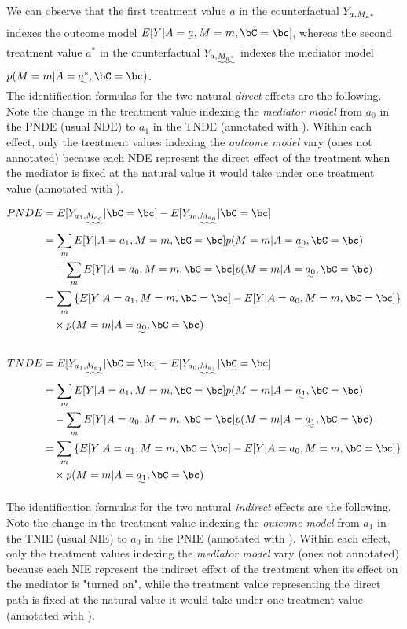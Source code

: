 \documentclass[10pt]{article}
\begin{document}
We can observe that the first treatment value \(a\) in the counterfactual \(Y_{\uwave{a},M_{a^{*}}}\) indexes the outcome model \(E[Y | A = \uwave{a}, M = m, \bC = \bc]\), whereas the second treatment value \(a^{*}\) in the counterfactual \(Y_{a,\uwave{M_{a^{*}}}}\) indexes the mediator model \(p(M = m | A = \uwave{a^{*}}, \bC = \bc)\).\\

The identification formulas for the two natural \emph{direct} effects are the following. Note the change in the treatment value indexing the \emph{mediator model} from \(a_{0}\) in the PNDE (usual NDE) to \(a_{1}\) in the TNDE (annotated with \uwave{~~~~}). Within each effect, only the treatment values indexing the \emph{outcome model} vary (ones not annotated) because each NDE represent the direct effect of the treatment when the mediator is fixed at the natural value it would take under one treatment value (annotated with \uwave{~~~~}).

\begin{align*}
  PNDE
  &= E[Y_{a_{1},\uwave{M_{a_{0}}}} | \bC = \bc] - E[Y_{a_{0},\uwave{M_{a_{0}}}} | \bC = \bc]\\
  &=     \sum_{m} E[Y | A = a_{1}, M = m, \bC = \bc] p(M = m | A = \uwave{a_{0}}, \bC = \bc)\\
  &~~~ - \sum_{m} E[Y | A = a_{0}, M = m, \bC = \bc] p(M = m | A = \uwave{a_{0}}, \bC = \bc)\\
  &= \sum_{m} \left\{ E[Y | A = a_{1}, M = m, \bC = \bc] - E[Y | A = a_{0}, M = m, \bC = \bc] \right\}\\
  &~~~ \times p(M = m | A = \uwave{a_{0}}, \bC = \bc)\\
  \\
  TNDE
  &= E[Y_{a_{1},\uwave{M_{a_{1}}}} | \bC = \bc] - E[Y_{a_{0},\uwave{M_{a_{1}}}} | \bC = \bc]\\
  &=     \sum_{m} E[Y | A = a_{1}, M = m, \bC = \bc] p(M = m | A = \uwave{a_{1}}, \bC = \bc)\\
  &~~~ - \sum_{m} E[Y | A = a_{0}, M = m, \bC = \bc] p(M = m | A = \uwave{a_{1}}, \bC = \bc)\\
  &= \sum_{m} \left\{ E[Y | A = a_{1}, M = m, \bC = \bc] - E[Y | A = a_{0}, M = m, \bC = \bc] \right\}\\
  &~~~ \times p(M = m | A = \uwave{a_{1}}, \bC = \bc)\\
\end{align*}

The identification formulas for the two natural \emph{indirect} effects are the following. Note the change in the treatment value indexing the \emph{outcome model} from \(a_{1}\) in the TNIE (usual NIE) to \(a_{0}\) in the PNIE (annotated with \uwave{~~~~}). Within each effect, only the treatment values indexing the \emph{mediator model} vary (ones not annotated) because each NIE represent the indirect effect of the treatment when its effect on the mediator is "turned on", while the treatment value representing the direct path is fixed at the natural value it would take under one treatment value (annotated with \uwave{~~~~}).
\end{document}
